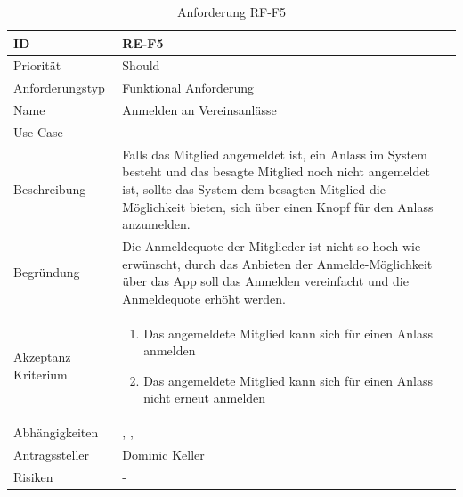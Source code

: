 \begin{table}[ht]
\centering
  \begin{tabular}{ l | p{8cm} }
	\hline
	\rowcolor{gray}
	ID 			&	\textbf{RE-F5}\\ \hline
	Priorität 		&	Should\\ \hline
	Anforderungstyp	&	Funktional Anforderung\\ \hline
	Name 			&	Anmelden an Vereinsanlässe\\ \hline
	Use Case 		&	\nameref{table:use_case_4}\\ \hline
	Beschreibung 	&	Falls das Mitglied angemeldet ist, ein Anlass im System besteht und das besagte Mitglied noch nicht angemeldet ist, sollte das System dem besagten Mitglied die Möglichkeit bieten, sich über einen Knopf für den Anlass anzumelden.\\ \hline
	Begründung 		&	Die Anmeldequote der Mitglieder ist nicht so hoch wie erwünscht, durch das Anbieten der Anmelde-Möglichkeit über das App soll das Anmelden vereinfacht und die Anmeldequote erhöht werden.\\ \hline
	Akzeptanz Kriterium	&	\begin{enumerate}
					\item Das angemeldete Mitglied kann sich für einen Anlass anmelden
					\item Das angemeldete Mitglied kann sich für einen Anlass nicht erneut anmelden
					\end{enumerate}
					\\ \hline
	Abhängigkeiten 	&	\nameref{table:req_1}, \nameref{table:req_2}, \nameref{table:req_3}\\ \hline
	Antragssteller 	&	Dominic Keller\\ \hline
	Risiken	 	&	-
  \end{tabular}
   \caption{Anforderung RF-F5}\label{table:req_5}
\end{table}

